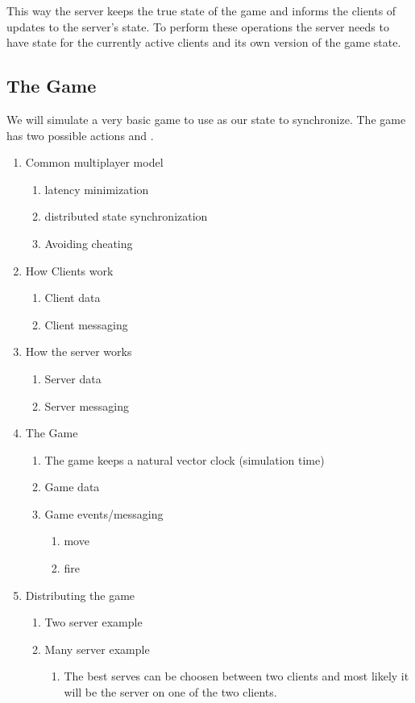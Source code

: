 	This way the server keeps the true state of the game and informs the clients of updates to the server's state. To perform these operations the server needs to have state for the currently active clients and its own version of the game state.

\subsection{The Game}

	We will simulate a very basic game to use as our state to synchronize. 
	The game has two possible actions \move{\agent}{\position} and .
\begin{enumerate}
	\item Common multiplayer model
		\begin{enumerate}
		\item latency minimization
		\item distributed state synchronization
		\item Avoiding cheating
	\end{enumerate}
	\item How Clients work
	\begin{enumerate}
		\item Client data
		\item Client messaging
	\end{enumerate}

	\item How the server works
	\begin{enumerate}
		\item Server data
		\item Server messaging
	\end{enumerate}
	\item The Game
	\begin{enumerate}
		\item The game keeps a natural vector clock (simulation time)
		\item Game data
		\item Game events/messaging
		\begin{enumerate}
			\item move
			\item fire
		\end{enumerate}
	\end{enumerate}
	\item Distributing the game
	\begin{enumerate}
		\item {Two server example}
		\item {Many server example}
		\begin{enumerate}
			\item The best serves can be choosen between two clients and most likely it will be the server on one of the two clients.
		\end{enumerate}
	\end{enumerate}
\end{enumerate}

